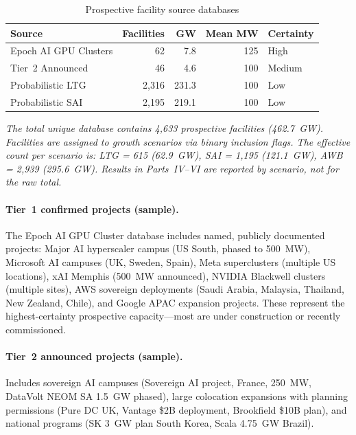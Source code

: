 \begin{table}[H]
\centering
\small
\caption{Prospective facility source databases}
\label{tab:app_source_databases}
\begin{tabular}{@{}p{4cm}rrrl@{}}
\toprule
\textbf{Source} & \textbf{Facilities} & \textbf{GW} & \textbf{Mean MW} & \textbf{Certainty} \\
\midrule
Epoch AI GPU Clusters & 62 & 7.8 & 125 & High \\
Tier~2 Announced & 46 & 4.6 & 100 & Medium \\
Probabilistic LTG & 2{,}316 & 231.3 & 100 & Low \\
Probabilistic SAI & 2{,}195 & 219.1 & 100 & Low \\
\bottomrule
\end{tabular}
\end{table}

\small\textit{The total unique database contains 4{,}633 prospective facilities (462.7~GW).
Facilities are assigned to growth scenarios via binary inclusion flags. The effective
count per scenario is: LTG = 615 (62.9~GW), SAI = 1{,}195 (121.1~GW), AWB = 2{,}939
(295.6~GW). Results in Parts~IV--VI are reported by scenario, not for the raw total.}
\normalsize

\paragraph{Tier~1 confirmed projects (sample).} The Epoch AI GPU Cluster database
includes named, publicly documented projects: Major AI hyperscaler campus (US South, phased to
500~MW), Microsoft AI campuses (UK, Sweden, Spain), Meta superclusters (multiple US
locations), xAI Memphis (500~MW announced), NVIDIA Blackwell clusters (multiple sites),
AWS sovereign deployments (Saudi Arabia, Malaysia, Thailand, New Zealand, Chile), and
Google APAC expansion projects. These represent the highest-certainty prospective
capacity---most are under construction or recently commissioned.

\paragraph{Tier~2 announced projects (sample).} Includes sovereign AI campuses
(Sovereign AI project, France, 250~MW, DataVolt NEOM SA 1.5~GW phased), large colocation expansions
with planning permissions (Pure DC UK, Vantage \$2B deployment, Brookfield \$10B plan),
and national programs (SK 3~GW plan South Korea, Scala 4.75~GW Brazil).


